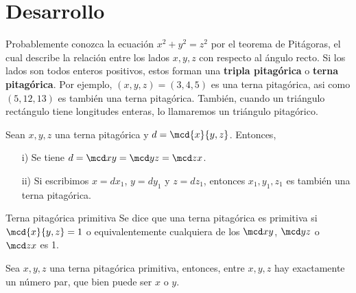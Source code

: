 \section{Desarrollo}
Probablemente conozca la ecuación $x^2 + y^2 = z^2$ por el teorema de Pitágoras, el cual describe la relación entre los lados $x,y,z$ con respecto al ángulo recto.
Si los lados son todos enteros positivos, estos forman una \textbf{tripla pitagórica} o \textbf{terna pitagórica}.
Por ejemplo, $(x,y,z) = (3,4,5)$ es una terna pitagórica, asi como $(5,12,13)$ es también una terna pitagórica.
También, cuando un triángulo rectángulo tiene longitudes enteras, lo llamaremos un triángulo pitagórico.

\begin{lemma}
    Sean $x,y,z$ una terna pitagórica y $d = \mcd{x}{y,z}$.
    Entonces,
    \begin{enumerate}
        \item [i)] Se tiene $d = \mcd x y = \mcd y z = \mcd z x$.
        \item [ii)] Si escribimos $x = d x_1$, $y = d y_1$ y $z = d z_1$, entonces $x_1, y_1, z_1$ es también una terna pitagórica.
    \end{enumerate}
\end{lemma}

\begin{definition.box}{Terna pitagórica primitiva}{}
    Se dice que una terna pitagórica es primitiva si $\mcd{x}{y,z} = 1$ o equivalentemente cualquiera de los $\mcd x y$, $\mcd y z$ o $\mcd z x$ es 1.
\end{definition.box}

\begin{lemma}
    Sea $x,y,z$ una terna pitagórica primitiva, entonces, entre $x,y,z$ hay exactamente un número par, que bien puede ser $x$ o $y$.
\end{lemma}

